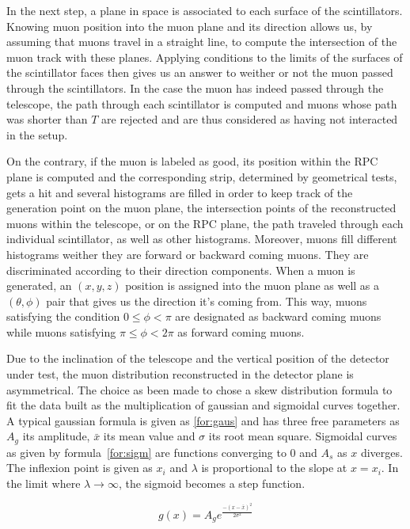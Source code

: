 			In the next step, a plane in space is associated to each surface of the scintillators. Knowing muon position into the muon plane and its direction allows us, by assuming that muons travel in a straight line, to compute the intersection of the muon track with these planes. Applying conditions to the limits of the surfaces of the scintillator faces then gives us an answer to weither or not the muon passed through the scintillators. In the case the muon has indeed passed through the telescope, the path through each scintillator is computed and muons whose path was shorter than $T$ are rejected and are thus considered as having not interacted in the setup.
			
			On the contrary, if the muon is labeled as good, its position within the RPC plane is computed and the corresponding strip, determined by geometrical tests, gets a hit and several histograms are filled in order to keep track of the generation point on the muon plane, the intersection points of the reconstructed muons within the telescope, or on the RPC plane, the path traveled through each individual scintillator, as well as other histograms. Moreover, muons fill different histograms weither they are forward or backward coming muons. They are discriminated according to their direction components. When a muon is generated, an $(x,y,z)$ position is assigned into the muon plane as well as a $(\theta,\phi)$ pair that gives us the direction it's coming from. This way, muons satisfying the condition $0\leq\phi<\pi$ are designated as backward coming muons while muons satisfying $\pi\leq\phi<2\pi$ as forward coming muons.
			
			Due to the inclination of the telescope and the vertical position of the detector under test, the muon distribution reconstructed in the detector plane is asymmetrical. The choice as been made to chose a skew distribution formula to fit the data built as the multiplication of gaussian and sigmoidal curves together. A typical gaussian formula is given as \ref{for:gaus} and has three free parameters as $A_g$ its amplitude, $\bar{x}$ its mean value and $\sigma$ its root mean square. Sigmoidal curves as given by formula~\ref{for:sigm} are functions converging to $0$ and $A_s$ as $x$ diverges. The inflexion point is given as $x_i$ and $\lambda$ is proportional to the slope at $x = x_i$. In the limit where $\lambda\longrightarrow\infty$, the sigmoid becomes a step function.
			
			\begin{center}
				\begin{equation}
				\label{for:gaus}
					g(x) = A_g e^{\frac{-(x-\bar{x})^2}{2\sigma^2}}
				\end{equation}
			\end{center}
			
